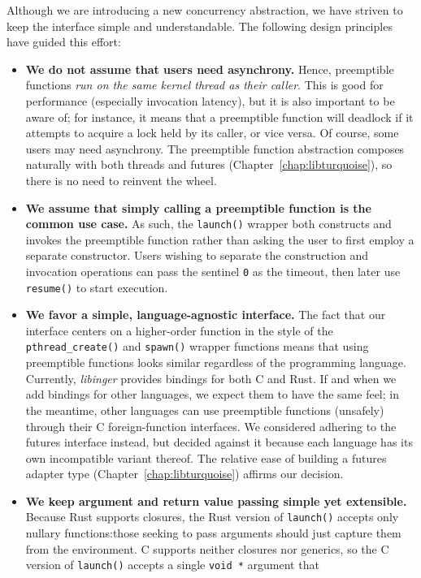Although we are introducing a new concurrency abstraction, we have striven to keep
the interface simple and understandable.  The following design principles have guided
this effort:
\begin{itemize}
\item \textbf{We do not assume that users need asynchrony.}  Hence, preemptible
	functions \textit{run on the same kernel thread as their caller}.  This is
	good for performance (especially invocation latency), but it is also
	important to be aware of; for instance, it means that a preemptible function
	will deadlock if it attempts to acquire a lock held by its caller, or vice
	versa.  Of course, some users may need asynchrony.  The preemptible function
	abstraction composes naturally with both threads and futures
	(Chapter~\ref{chap:libturquoise}), so there is no need to reinvent the wheel.
\item \textbf{We assume that simply calling a preemptible function is the common use
	case.}  As such, the \texttt{launch()} wrapper both constructs and invokes
	the preemptible function rather than asking the user to first employ a
	separate constructor.  Users wishing to separate the construction and
	invocation operations can pass the sentinel \texttt{0} as the
	timeout, then later use \texttt{resume()} to start execution.
\item \textbf{We favor a simple, language-agnostic interface.}  The fact that our
	interface centers on a higher-order function in the style of the
	\texttt{pthread\_create()} and \texttt{spawn()} wrapper functions means that
	using preemptible functions looks similar regardless of the programming
	language.  Currently, \textit{libinger} provides bindings for both C and
	Rust.  If and when we add bindings for other languages, we expect them to
	have the same feel; in the meantime, other languages can use preemptible
	functions (unsafely) through their C
	foreign-function interfaces.  We considered adhering to the futures interface
	instead, but decided against it because each language has its own
	incompatible variant thereof.  The relative ease of building a futures
	adapter type (Chapter~\ref{chap:libturquoise}) affirms our decision.
\item \textbf{We keep argument and return value passing simple yet extensible.}
	Because Rust supports closures, the Rust version of \texttt{launch()} accepts
	only nullary functions:\@ those seeking to pass arguments should just capture
	them from the environment.  C supports neither closures nor generics, so the
	C version of \texttt{launch()} accepts a single \texttt{void *} argument that

\end{itemize}
